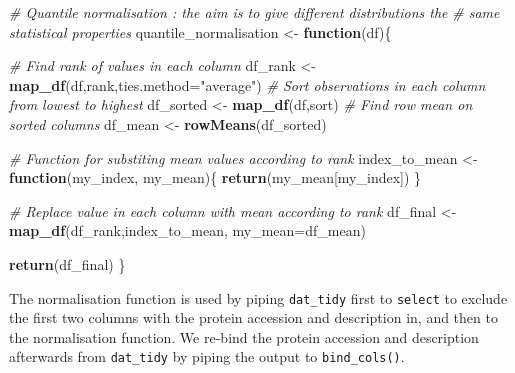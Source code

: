 \documentclass[12pt,]{book}
\newenvironment{Shaded}{\begin{snugshade}}{\end{snugshade}}
\newcommand{\KeywordTok}[1]{\textcolor[rgb]{0.13,0.29,0.53}{\textbf{#1}}}
\newcommand{\DataTypeTok}[1]{\textcolor[rgb]{0.13,0.29,0.53}{#1}}
\newcommand{\DecValTok}[1]{\textcolor[rgb]{0.00,0.00,0.81}{#1}}
\newcommand{\StringTok}[1]{\textcolor[rgb]{0.31,0.60,0.02}{#1}}
\newcommand{\CommentTok}[1]{\textcolor[rgb]{0.56,0.35,0.01}{\textit{#1}}}
\newcommand{\ControlFlowTok}[1]{\textcolor[rgb]{0.13,0.29,0.53}{\textbf{#1}}}
\newcommand{\OperatorTok}[1]{\textcolor[rgb]{0.81,0.36,0.00}{\textbf{#1}}}
\newcommand{\NormalTok}[1]{#1}
\theoremstyle{definition}
\theoremstyle{definition}
\theoremstyle{definition}
\theoremstyle{remark}
\begin{document}
\begin{Shaded}
\begin{Highlighting}[]
\CommentTok{# Quantile normalisation : the aim is to give different distributions the}
\CommentTok{# same statistical properties}
\NormalTok{quantile_normalisation <-}\StringTok{ }\ControlFlowTok{function}\NormalTok{(df)\{}
  
  \CommentTok{# Find rank of values in each column}
\NormalTok{  df_rank <-}\StringTok{ }\KeywordTok{map_df}\NormalTok{(df,rank,}\DataTypeTok{ties.method=}\StringTok{"average"}\NormalTok{)}
  \CommentTok{# Sort observations in each column from lowest to highest }
\NormalTok{  df_sorted <-}\StringTok{ }\KeywordTok{map_df}\NormalTok{(df,sort)}
  \CommentTok{# Find row mean on sorted columns}
\NormalTok{  df_mean <-}\StringTok{ }\KeywordTok{rowMeans}\NormalTok{(df_sorted)}
  
  \CommentTok{# Function for substiting mean values according to rank }
\NormalTok{  index_to_mean <-}\StringTok{ }\ControlFlowTok{function}\NormalTok{(my_index, my_mean)\{}
    \KeywordTok{return}\NormalTok{(my_mean[my_index])}
\NormalTok{  \}}
  
  \CommentTok{# Replace value in each column with mean according to rank }
\NormalTok{  df_final <-}\StringTok{ }\KeywordTok{map_df}\NormalTok{(df_rank,index_to_mean, }\DataTypeTok{my_mean=}\NormalTok{df_mean)}
  
  \KeywordTok{return}\NormalTok{(df_final)}
\NormalTok{\}}
\end{Highlighting}
\end{Shaded}

The normalisation function is used by piping \texttt{dat\_tidy} first to
\texttt{select} to exclude the first two columns with the protein
accession and description in, and then to the normalisation function. We
re-bind the protein accession and description afterwards from
\texttt{dat\_tidy} by piping the output to \texttt{bind\_cols()}.

\begin{Shaded}
\end{Shaded}
\end{document}
